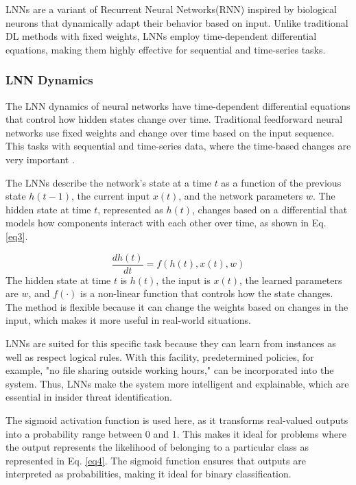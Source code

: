 LNNs are a variant of Recurrent Neural Networks(RNN) inspired by biological neurons that dynamically adapt their behavior based on input. Unlike traditional DL methods with fixed weights, LNNs employ time-dependent differential equations, making them highly effective for sequential and time-series tasks.

\subsubsection{LNN Dynamics}
The LNN dynamics of neural networks \cite{hasani2021liquid} have time-dependent differential equations that control how hidden states change over time. Traditional feedforward neural networks use fixed weights and change over time based on the input sequence. This tasks with sequential and time-series data, where the time-based changes are very important \cite{akpinar2025novel, han2025robust}.

The LNNs describe the network's state at a time \( t \) as a function of the previous state \( h(t-1) \), the current input \( x(t) \), and the network parameters \( w \). The hidden state at time \( t \), represented as \( h(t) \), changes based on a differential that models how components interact with each other over time, as shown in Eq. \ref{eq3}.


\begin{equation}\label{eq3}
\frac{d h(t)}{dt} = f(h(t), x(t), w)
\end{equation}
The hidden state at time \( t \) is \( h(t) \), the input is \( x(t) \), the learned parameters are \( w \), and \( f(\cdot) \) is a non-linear function that controls how the state changes. The method is flexible because it can change the weights based on changes in the input, which makes it more useful in real-world situations.

 LNNs are suited for this specific task because they can learn from instances as well as respect logical rules. With this facility, predetermined policies, for example, "no file sharing outside working hours," can be incorporated into the system. Thus, LNNs make the system more intelligent and explainable, which are essential in insider threat identification.

The sigmoid activation function is  used here, as it transforms real-valued outputs into a probability range between 0 and 1. This makes it ideal for problems where the output represents the likelihood of belonging to a particular class as represented in Eq. \ref{eq4}. The sigmoid function ensures that outputs are interpreted as probabilities, making it ideal for binary classification.

